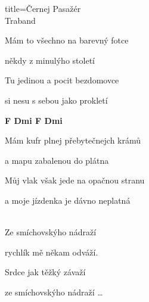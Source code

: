 \begin{song}{title=\centering Černej Pasažér \\\normalsize Traband \vspace*{-0.3cm}}
{\begin{minipage}[t]{0.48\textwidth}
\sloka
Mám to všechno na barevný fotce  

někdy z minulýho století 

Tu jedinou a pocit bezdomovce 

si nesu s sebou jako prokletí

\mezera
\textbf{F  Dmi F  Dmi }


\sloka
Mám kufr plnej přebytečnejch krámů 

a mapu zabalenou do plátna 

Můj vlak však jede na opačnou stranu 

a moje jízdenka je dávno neplatná

\\

Ze smíchovskýho nádraží

rychlík mě někam odváží.

Srdce jak těžký závaží

ze smíchovskýho nádraží \dots

\end{minipage}   %
}
\end{song}
\setcounter{Slokočet}{0}
